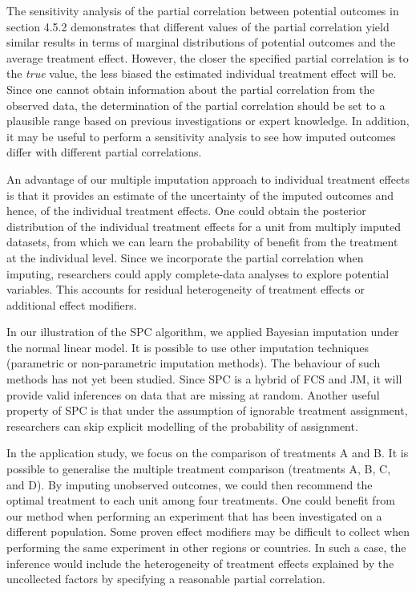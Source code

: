 	The sensitivity analysis of the partial correlation between potential outcomes in section 4.5.2 demonstrates that different values of the partial correlation yield similar results in terms of marginal distributions of potential outcomes and the average treatment effect. However, the closer the specified partial correlation is to the \emph{true} value, the less biased the estimated individual treatment effect will be. Since one cannot obtain information about the partial correlation from the observed data, the determination of the partial correlation should be set to a plausible range based on previous investigations or expert knowledge. In addition, it may be useful to perform a sensitivity analysis to see how imputed outcomes differ with different partial correlations. 
	
	An advantage of our multiple imputation approach to individual treatment effects is that it provides an estimate of the uncertainty of the imputed outcomes and hence, of the individual treatment effects. One could obtain the posterior distribution of the individual treatment effects for a unit from multiply imputed datasets, from which we can learn the probability of benefit from the treatment at the individual level. Since we incorporate the partial correlation when imputing, researchers could apply complete-data analyses to explore potential variables. This accounts for residual heterogeneity of treatment effects or additional effect modifiers. 
	
	In our illustration of the SPC algorithm, we applied Bayesian imputation under the normal linear model. It is possible to use other imputation techniques (parametric or non-parametric imputation methods). The behaviour of such methods has not yet been studied. Since SPC is a hybrid of FCS and JM, it will provide valid inferences on data that are missing at random.  Another useful property of SPC is that under the assumption of ignorable treatment assignment, researchers can skip explicit modelling of the probability of assignment. 
	
	In the application study, we focus on the comparison of treatments A and B. It is possible to generalise the multiple treatment comparison (treatments A, B, C, and D). By imputing unobserved outcomes, we could then recommend the optimal treatment to each unit among four treatments. One could benefit from our method when performing an experiment that has been investigated on a different population. Some proven effect modifiers may be difficult to collect when performing the same experiment in other regions or countries. In such a case, the inference would include the heterogeneity of treatment effects explained by the uncollected factors by specifying a reasonable partial correlation.         
	

